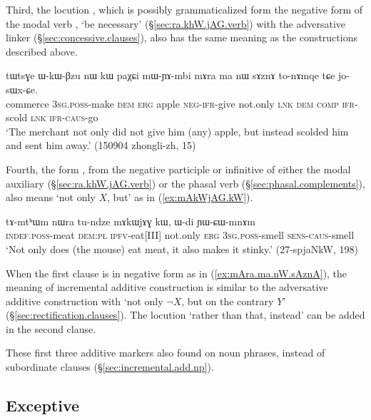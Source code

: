 Third, the locution , which is possibly grammaticalized form the negative form of the modal verb , `be necessary' (§\ref{sec:ra.khW.jAG.verb}) with the adversative linker  (§\ref{sec:concessive.clauses}), also has the same meaning as the constructions described above.

\begin{exe}
\ex \label{ex:mAra.ma.nW.sAznA}
\gll tɯtsɣe ɯ-kɯ-βzu nɯ kɯ paχɕi mɯ-ɲɤ-mbi mɤra ma nɯ sɤznɤ to-nɤmqe tɕe jo-sɯx-ɕe. \\
commerce \textsc{3sg}.\textsc{poss}-make \textsc{dem} \textsc{erg} apple \textsc{neg}-\textsc{ifr}-give not.only \textsc{lnk} \textsc{dem} \textsc{comp} \textsc{ifr}-scold \textsc{lnk} \textsc{ifr}-\textsc{caus}-go \\
\glt `The merchant not only did not give him (any) apple, but instead scolded him and sent him away.' (150904 zhongli-zh, 15)
\end{exe}

Fourth, the form , from the negative participle or infinitive of either the modal auxiliary  (§\ref{sec:ra.khW.jAG.verb}) or the phasal verb  (§\ref{sec:phasal.complements}), also means `not only $X$, but' as in (\ref{ex:mAkWjAG.kW}).

 \begin{exe}
\ex \label{ex:mAkWjAG.kW}
\gll tɤ-mtʰɯm nɯra tu-ndze mɤkɯjɤɣ kɯ, ɯ-di ɲɯ-ɕɯ-mnɤm \\
\textsc{indef}.\textsc{poss}-meat \textsc{dem}:\textsc{pl} \textsc{ipfv}-eat[III] not.only \textsc{erg} \textsc{3sg}.\textsc{poss}-smell \textsc{sens}-\textsc{caus}-smell \\
\glt  `Not only does (the mouse) eat meat, it also makes it stinky.' (27-spjaNkW, 198)
\end{exe}


When the first clause is in negative form as in (\ref{ex:mAra.ma.nW.sAznA}), the meaning of incremental additive construction is similar to the adversative additive construction with  `not only $\neg X$, but on the contrary $Y$' (§\ref{sec:rectification.clauses}). The locution  `rather than that, instead' can be added in the second clause.

These first three additive markers also found on noun phrases, instead of subordinate clauses (§\ref{sec:incremental.add.np}).


\subsection{Exceptive} \label{sec:exceptive.clauses}

